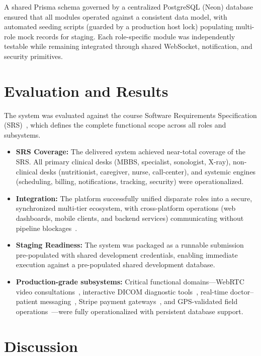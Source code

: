 \documentclass[conference]{IEEEtran}
\begin{document}
A shared Prisma schema governed by a centralized PostgreSQL (Neon) database ensured that all modules operated against a consistent data model, with automated seeding scripts (guarded by a production host lock) populating multi-role mock records for staging. Each role-specific module was independently testable while remaining integrated through shared WebSocket, notification, and security primitives.

\section{Evaluation and Results}

The system was evaluated against the course Software Requirements Specification (SRS)~\cite{srs2026}, which defines the complete functional scope across all roles and subsystems.

\begin{itemize}
\item \textbf{SRS Coverage:} The delivered system achieved near-total coverage of the SRS. All primary clinical desks (MBBS, specialist, sonologist, X-ray), non-clinical desks (nutritionist, caregiver, nurse, call-center), and systemic engines (scheduling, billing, notifications, tracking, security) were operationalized.
\item \textbf{Integration:} The platform successfully unified disparate roles into a secure, synchronized multi-tier ecosystem, with cross-platform operations (web dashboards, mobile clients, and backend services) communicating without pipeline blockages~\cite{srs2026}.
\item \textbf{Staging Readiness:} The system was packaged as a runnable submission pre-populated with shared development credentials, enabling immediate execution against a pre-populated shared development database.
\item \textbf{Production-grade subsystems:} Critical functional domains---WebRTC video consultations~\cite{agorawebrtc}, interactive DICOM diagnostic tools~\cite{dicom2021}, real-time doctor--patient messaging~\cite{fette2011websocket}, Stripe payment gateways~\cite{stripe2024api}, and GPS-validated field operations~\cite{zandbergen2009accuracy}---were fully operationalized with persistent database support.
\end{itemize}

\section{Discussion}
\end{document}
